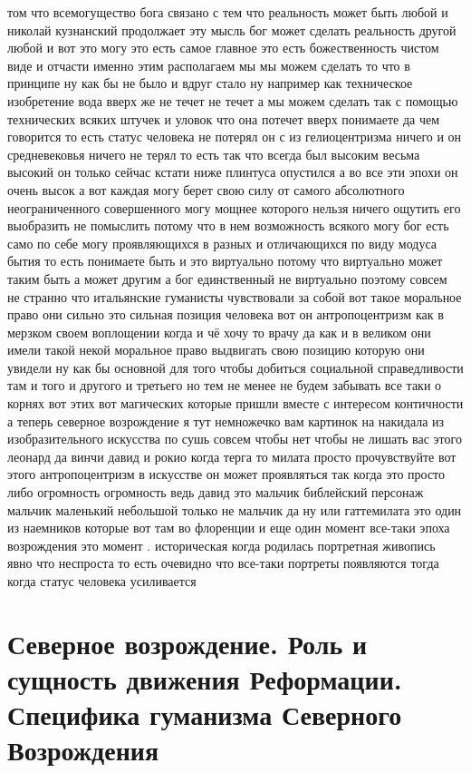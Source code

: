 том что всемогущество бога связано с тем что реальность может быть любой и
николай кузнанский продолжает эту мысль бог может сделать реальность другой
любой и вот это могу это есть самое главное это есть божественность чистом виде
и отчасти именно этим располагаем мы мы можем сделать то что в принципе ну как
бы не было и вдруг стало ну например как техническое изобретение вода вверх же
не течет не течет а мы можем сделать так с помощью технических всяких штучек и
уловок что она потечет вверх понимаете да чем говорится то есть статус человека
не потерял он с из гелиоцентризма ничего и он средневековья ничего не терял то
есть так что всегда был высоким весьма высокий он только сейчас кстати ниже
плинтуса опустился а во все эти эпохи он очень высок а вот каждая могу берет
свою силу от самого абсолютного неограниченного совершенного могу мощнее
которого нельзя ничего ощутить его выобразить не помыслить потому что в нем
возможность всякого могу бог есть само по себе могу проявляющихся в разных и
отличающихся по виду модуса бытия то есть понимаете быть и это виртуально потому
что виртуально может таким быть а может другим а бог единственный не виртуально
поэтому совсем не странно что итальянские гуманисты чувствовали за собой вот
такое моральное право они сильно это сильная позиция человека вот он
антропоцентризм как в мерзком своем воплощении когда и чё хочу то врачу да как и
в великом они имели такой некой моральное право выдвигать свою позицию которую
они увидели ну как бы основной для того чтобы добиться социальной справедливости
там и того и другого и третьего но тем не менее не будем забывать все таки о
корнях вот этих вот магических которые пришли вместе с интересом контичности а
теперь северное возрождение я тут немножечко вам картинок на накидала из
изобразительного искусства по сушь совсем чтобы нет чтобы не лишать вас этого
леонард да винчи давид и рокио когда терга то милата просто прочувствуйте вот
этого антропоцентризм в искусстве он может проявляться так когда это просто либо
огромность огромность ведь давид это мальчик библейский персонаж мальчик
маленький небольшой только не мальчик да ну или гаттемилата это один из
наемников которые вот там во флоренции и еще один момент все-таки эпоха
возрождения это момент . историческая когда родилась портретная живопись явно
что неспроста то есть очевидно что все-таки портреты появляются тогда когда
статус человека усиливается 

\section{Северное возрождение. Роль и сущность движения Реформации. Специфика гуманизма Северного Возрождения}

